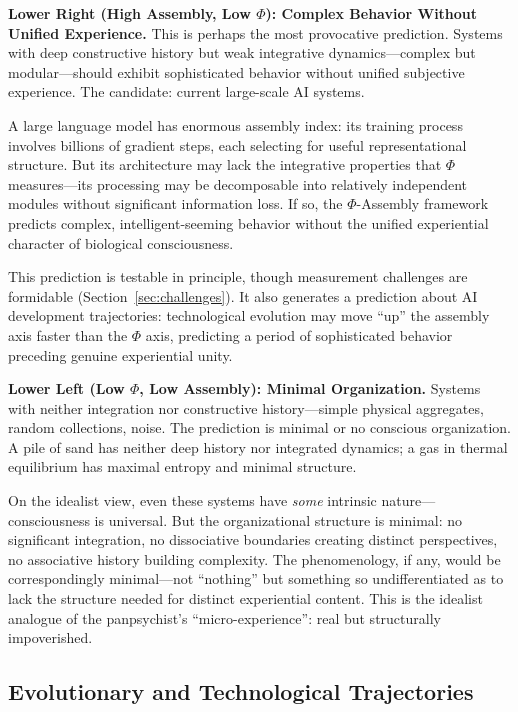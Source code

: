 \documentclass[11pt,a4paper]{article}
\theoremstyle{definition}
\theoremstyle{plain}
\theoremstyle{remark}
\begin{document}
\textbf{Lower Right (High Assembly, Low $\Phi$): Complex Behavior Without Unified Experience.} This is perhaps the most provocative prediction. Systems with deep constructive history but weak integrative dynamics---complex but modular---should exhibit sophisticated behavior without unified subjective experience. The candidate: current large-scale AI systems.

A large language model has enormous assembly index: its training process involves billions of gradient steps, each selecting for useful representational structure. But its architecture may lack the integrative properties that $\Phi$ measures---its processing may be decomposable into relatively independent modules without significant information loss. If so, the $\Phi$-Assembly framework predicts complex, intelligent-seeming behavior without the unified experiential character of biological consciousness.

This prediction is testable in principle, though measurement challenges are formidable (Section~\ref{sec:challenges}). It also generates a prediction about AI development trajectories: technological evolution may move ``up'' the assembly axis faster than the $\Phi$ axis, predicting a period of sophisticated behavior preceding genuine experiential unity.

\textbf{Lower Left (Low $\Phi$, Low Assembly): Minimal Organization.} Systems with neither integration nor constructive history---simple physical aggregates, random collections, noise. The prediction is minimal or no conscious organization. A pile of sand has neither deep history nor integrated dynamics; a gas in thermal equilibrium has maximal entropy and minimal structure.

On the idealist view, even these systems have \textit{some} intrinsic nature---consciousness is universal. But the organizational structure is minimal: no significant integration, no dissociative boundaries creating distinct perspectives, no associative history building complexity. The phenomenology, if any, would be correspondingly minimal---not ``nothing'' but something so undifferentiated as to lack the structure needed for distinct experiential content. This is the idealist analogue of the panpsychist's ``micro-experience'': real but structurally impoverished.

\subsection{Evolutionary and Technological Trajectories}\label{sec:trajectories}
\end{document}
